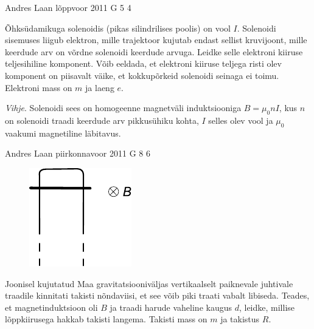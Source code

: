 \documentclass[11pt]{article}
\begin{document}
{%
{Andres Laan} %
{lõppvoor} %
{2011} %
{G 5} %
{4} %
{
\ifStatement
Õhksüdamikuga solenoidis (pikas silindrilises poolis) on vool
$I$. Solenoidi sisemuses liigub elektron, mille trajektoor kujutab endast sellist
kruvijoont, mille keerdude arv on võrdne solenoidi keerdude arvuga. Leidke
selle elektroni kiiruse teljesihiline komponent. Võib eeldada, et elektroni kiiruse teljega risti olev komponent on piisavalt väike, et kokkupõrkeid solenoidi
seinaga ei toimu. Elektroni mass on $m$ ja laeng $e$.

\emph{Vihje}. Solenoidi sees on
homogeenne magnetväli induktsiooniga $B = \mu_0nI$, kus $n$ on solenoidi traadi
keerdude arv pikkusühiku kohta, $I$ selles olev vool ja $\mu_0$ vaakumi magnetiline
läbitavus.
\fi
}

{Andres Laan} %
{piirkonnavoor} %
{2011} %
{G 8} %
{6} %
{
\ifStatement
\begin{figure}
	\vspace{-20pt}	
	\begin{center}
		\includegraphics[width=0.9\linewidth]{2011-v2g-08-yl}
	\end{center}
	\vspace{-20pt}
\end{figure}

Joonisel kujutatud Maa gravitatsiooniväljas vertikaalselt paiknevale juhtivale traadile kinnitati takisti nõndaviisi, et see võib piki traati vabalt libiseda. Teades, et magnetinduktsioon oli $B$ ja traadi harude vaheline kaugus $d$, leidke, millise lõppkiirusega hakkab takisti langema. Takisti mass on $m$ ja takistus $R$.
\fi
}

}
\end{document}
